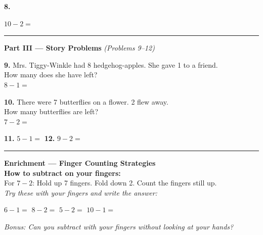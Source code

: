 \documentclass[12pt, letterpaper]{article}
\newcommand{\numbox}{\fbox{\hspace{0.6cm}\vphantom{0}}}
\begin{document}
\bigskip
\noindent\textbf{8.} \quad
{}
\hfill $10 - 2 = $ \numbox

\bigskip
\noindent\textcolor{scholared}{\rule{\linewidth}{0.4pt}}

\noindent\textcolor{scholared}{\large\textbf{Part III — Story Problems}} \hfill \textit{(Problems 9–12)}

\bigskip

\begin{storybox}
\textbf{9.} Mrs. Tiggy-Winkle had 8 hedgehog-apples. She gave 1 to a friend.\\
How many does she have left?\\[6pt]
\hspace{1em} $8 - 1 = $ \numbox
\end{storybox}

\bigskip

\begin{storybox}
\textbf{10.} There were 7 butterflies on a flower. 2 flew away.\\
How many butterflies are left?\\[6pt]
\hspace{1em} $7 - 2 = $ \numbox
\end{storybox}

\bigskip
\noindent\textbf{11.} $5 - 1 = $ \numbox \hspace{2cm} \textbf{12.} $9 - 2 = $ \numbox

\bigskip
\noindent\textcolor{scholared}{\rule{\linewidth}{0.4pt}}

\begin{lessonbox}
\textcolor{scholared}{\textbf{Enrichment — Finger Counting Strategies}}\\[6pt]
\noindent\textbf{How to subtract on your fingers:}\\[4pt]
For $7 - 2$: Hold up 7 fingers. Fold down 2. Count the fingers still up.\\[4pt]
\noindent\textit{Try these with your fingers and write the answer:}

\medskip
$6 - 1 = $ \numbox \hspace{1cm}
$8 - 2 = $ \numbox \hspace{1cm}
$5 - 2 = $ \numbox \hspace{1cm}
$10 - 1 = $ \numbox

\medskip
\noindent\textit{Bonus: Can you subtract with your fingers without looking at your hands?}
\end{lessonbox}
\end{document}

